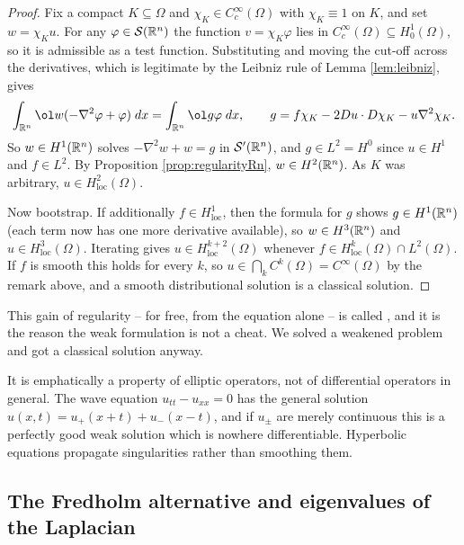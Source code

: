 \documentclass[a4paper]{scrartcl}
\newcommand{\Sch}{\mathcal{S}}
\begin{document}
\begin{proof}
	Fix a compact $K\subseteq\Omega$ and $\chi_K\in C_c^\infty(\Omega)$ with $\chi_K\equiv1$ on $K$, and set $w = \chi_Ku$. For any $\varphi\in\Sch(\R^n)$ the function $v = \chi_K\varphi$ lies in $C_c^\infty(\Omega)\subseteq H_0^1(\Omega)$, so it is admissible as a test function. Substituting and moving the cut-off across the derivatives, which is legitimate by the Leibniz rule of Lemma \ref{lem:leibniz}, gives
	$$\int_{\R^n}\ol w(-\nabla^2\varphi+\varphi)\dd x = \int_{\R^n}\ol g\varphi\dd x, \qquad g = f\chi_K - 2Du\cdot D\chi_K-u\nabla^2\chi_K.$$
	So $w \in H^1(\mathbb{R}^n)$ solves $-\nabla^2w+w=g$ in $\Sch'(\R^n)$, and $g \in L^2 = H^0$ since $u \in H^1$ and $f \in L^2$. By Proposition \ref{prop:regularityRn}, $w \in H^2(\mathbb{R}^n)$. As $K$ was arbitrary, $u \in H^2_{\mathrm{loc}}(\Omega)$.

	Now bootstrap. If additionally $f \in H^1_{\mathrm{loc}}$, then the formula for $g$ shows $g\in H^1(\mathbb{R}^n)$ (each term now has one more derivative available), so $w \in H^3(\mathbb{R}^n)$ and $u\in H^3_{\mathrm{loc}}(\Omega)$. Iterating gives $u \in H^{k+2}_{\mathrm{loc}}(\Omega)$ whenever $f\in H^k_{\mathrm{loc}}(\Omega)\cap L^2(\Omega)$. If $f$ is smooth this holds for every $k$, so $u \in \bigcap_kC^k(\Omega)=C^\infty(\Omega)$ by the remark above, and a smooth distributional solution is a classical solution.
\end{proof}

This gain of regularity -- for free, from the equation alone -- is called , and it is the reason the weak formulation is not a cheat. We solved a weakened problem and got a classical solution anyway.

\begin{remark}
	It is emphatically a property of elliptic operators, not of differential operators in general. The wave equation $u_{tt}-u_{xx}=0$ has the general solution $u(x,t)=u_+(x+t)+u_-(x-t)$, and if $u_\pm$ are merely continuous this is a perfectly good weak solution which is nowhere differentiable. Hyperbolic equations propagate singularities rather than smoothing them.
\end{remark}

\subsection{The Fredholm alternative and eigenvalues of the Laplacian}
\end{document}
